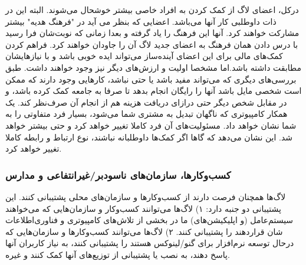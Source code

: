 درکل، اعضای لاگ از کمک کردن به افراد خاصی بیشتر خوشحال می‌شوند.
البته این در ذات داوطلبی کار آنها می‌باشد. اعضایی که بنظر می آید
در "فرهنگ هدیه" بیشتر مشارکت خواهند کرد. آنها این فرهنگ
را یاد گرفته و بعدا زمانی که نوبت‌شان فرا رسید با درس دادن همان فرهنگ
به اعضای جدید لاگ آن را جاودان خواهند کرد.
فراهم کردن کمک‌های مالی برای این اعضای آینده‌ساز می‌تواند ایده خوبی باشد
و با نیازهایشان مطابقت داشته باشد.اما مشخصا اولیت‌
و ارزش‌های دیگر نیز وجود خواهند داشت.
طبق بررسی‌های دیگری که می‌تواند مفید باشد یا حتی نباشد،
کارهایی وجود دارند که ممکن است شخصی مایل باشد آنها را
رایگان انجام بدهد تا صرفا به جامعه کمک کرده باشد،
و در مقابل شخص دیگر حتی درازای دریافت هزینه هم
از انجام آن صرف‌نظر کند.
یک همکار کامپیوتری که ناگهان تبدیل به مشتری شما می‌شود،
بسیار فرد متفاوتی را به شما نشان خواهد داد. مسئولیت‌های
آن فرد کاملا تغییر خواهد کرد و حتی بیشتر خواهد شد.
این نشان می‌دهد که گاها اگر کمک‌ها داوطلبانه نباشند،
نوع ارتباط و رابطه کاملا تغییر خواهد کرد.

\subsubsection{کسب‌وکارها، سازمان‌های ناسودبر/غیرانتفاعی و مدارس}

لاگ‌ها همچنان فرصت دارند از کسب‌و‌کارها و سازمان‌‌های محلی
پشتیبانی کنند. این پشتیبانی دو جنبه دارد:
۱) لاگ‌ها می‌توانند کسب‌وکار و سازمان‌هایی که می‌خواهند
سیستم‌عامل (و اپلیکیشن‌های) ما در بخشی از تلاش‌های
کامپیوتری و فناوری‌اطلاعات شان قراردهند را پشتیبانی کنند.
۲) لاگ‌ها می‌توانند کسب‌وکارها و سازمان‌هایی که درحال
توسعه نرم‌افزار برای گنو/لینوکس هستند را پشتیبانی کنند،
به نیاز کاربران آنها پاسخ دهند، به نصب یا پشتیبانی از
توزیع‌های آنها کمک کنند و غیره.

